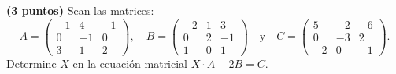 
\textbf{(3 puntos)} Sean las matrices:
\[
A=\begin{pmatrix}-1&4&-1\\0&-1&0\\3&1&2\end{pmatrix},\quad B=\begin{pmatrix}-2&1&3\\0&2&-1\\1&0&1\end{pmatrix}\quad\text{y}\quad C=\begin{pmatrix}5&-2&-6\\0&-3&2\\-2&0&-1\end{pmatrix}.
\]
Determine $X$ en la ecuación matricial $X\cdot A-2B=C$.
